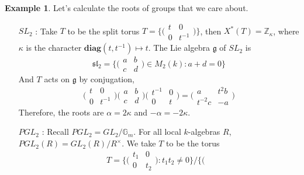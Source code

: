 \documentclass[12pt,a4paper,english]{article}
\theoremstyle{plain}
\theoremstyle{definition}
\newtheorem*{ex}{Example}
\begin{document}
\begin{ex}
Let's calculate the roots of groups that we care about.
\begin{enumerate}
    \item[$SL_{2}$]: Take $T$ to be the split torus 
    $T=\bigg\{\bigg(\begin{array}{cc}
        t & 0 \\
        0 & t^{-1}
    \end{array}\bigg)\bigg\}$, then $X^{*}(T)=\mathbb{Z}_{\kappa}$, where $\kappa$ is the character $\textbf{diag}(t,t^{-1})\mapsto t$. The Lie algebra $\mathfrak{g}$ of $SL_{2}$ is \begin{equation*}
        \mathfrak{sl_{2}}=\bigg\{\bigg(\begin{array}{cc}
            a & b \\
            c & d
        \end{array}\bigg)\in M_{2}(k): a+d=0\bigg\}
    \end{equation*} 
    And $T$ acts on $\mathfrak{g}$ by conjugation,
    \begin{equation*}\bigg(\begin{array}{cc}
            t & 0 \\
            0 & t^{-1}
        \end{array}\bigg)
\bigg(\begin{array}{cc}
            a & b \\
            c & d
        \end{array}\bigg)\bigg(\begin{array}{cc}
            t^{-1} & 0 \\
            0 & t
        \end{array}\bigg)=
        \bigg(\begin{array}{cc}
            a & t^{2}b \\
            t^{-2}c & -a
        \end{array}\bigg)
    \end{equation*}
    Therefore, the roots are $\alpha=2\kappa$ and $-\alpha=-2\kappa$.
    \item[$PGL_{2}$]: Recall $PGL_{2}=GL_{2}/\mathbb{G}_{m}$. For all local $k$-algebras $R$, $PGL_{2}(R)=GL_{2}(R)/R^{\times}$. We take $T$ to be the torus
    \begin{equation*}
        T=\bigg\{\bigg(\begin{array}{cc}
            t_{1} & 0 \\
            0 & t_{2}
        \end{array}\bigg): t_{1}t_{2}\not=0\bigg\}/\bigg\{\bigg(\begin{array}{cc}

\end{array}
\end{equation*}
\end{enumerate}
\end{ex}
\end{document}

